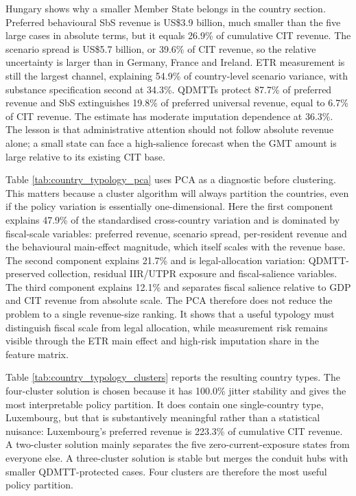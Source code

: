 \documentclass[11pt,a4paper]{article}
\begin{document}
Hungary shows why a smaller Member State belongs in the country section. Preferred behavioural SbS revenue is US\$3.9 billion, much smaller than the five large cases in absolute terms, but it equals 26.9\% of cumulative CIT revenue. The scenario spread is US\$5.7 billion, or 39.6\% of CIT revenue, so the relative uncertainty is larger than in Germany, France and Ireland. ETR measurement is still the largest channel, explaining 54.9\% of country-level scenario variance, with substance specification second at 34.3\%. QDMTTs protect 87.7\% of preferred revenue and SbS extinguishes 19.8\% of preferred universal revenue, equal to 6.7\% of CIT revenue. The estimate has moderate imputation dependence at 36.3\%. The lesson is that administrative attention should not follow absolute revenue alone; a small state can face a high-salience forecast when the GMT amount is large relative to its existing CIT base.



Table \ref{tab:country_typology_pca} uses PCA as a diagnostic before clustering. This matters because a cluster algorithm will always partition the countries, even if the policy variation is essentially one-dimensional. Here the first component explains 47.9\% of the standardised cross-country variation and is dominated by fiscal-scale variables: preferred revenue, scenario spread, per-resident revenue and the behavioural main-effect magnitude, which itself scales with the revenue base. The second component explains 21.7\% and is legal-allocation variation: QDMTT-preserved collection, residual IIR/UTPR exposure and fiscal-salience variables. The third component explains 12.1\% and separates fiscal salience relative to GDP and CIT revenue from absolute scale. The PCA therefore does not reduce the problem to a single revenue-size ranking. It shows that a useful typology must distinguish fiscal scale from legal allocation, while measurement risk remains visible through the ETR main effect and high-risk imputation share in the feature matrix.



Table \ref{tab:country_typology_clusters} reports the resulting country types. The four-cluster solution is chosen because it has 100.0\% jitter stability and gives the most interpretable policy partition. It does contain one single-country type, Luxembourg, but that is substantively meaningful rather than a statistical nuisance: Luxembourg's preferred revenue is 223.3\% of cumulative CIT revenue. A two-cluster solution mainly separates the five zero-current-exposure states from everyone else. A three-cluster solution is stable but merges the conduit hubs with smaller QDMTT-protected cases. Four clusters are therefore the most useful policy partition.
\end{document}

